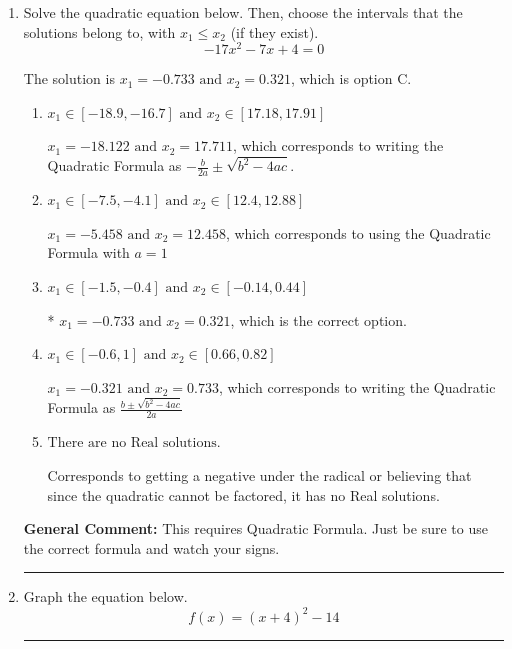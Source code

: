\documentclass{extbook}[14pt]
\newcommand{\litem}[1]{\item #1

\rule{\textwidth}{0.4pt}}
\begin{document}
\begin{enumerate}\litem{
Solve the quadratic equation below. Then, choose the intervals that the solutions belong to, with $x_1 \leq x_2$ (if they exist).
\[ -17x^{2} -7 x + 4 = 0 \]

The solution is \( x_1 = -0.733 \text{ and } x_2 = 0.321 \), which is option C.\begin{enumerate}[label=\Alph*.]
\item \( x_1 \in [-18.9, -16.7] \text{ and } x_2 \in [17.18, 17.91] \)

 $x_1 = -18.122 \text{ and } x_2 = 17.711$, which corresponds to writing the Quadratic Formula as $-\frac{b}{2a} \pm \sqrt{b^2 - 4ac}$.
\item \( x_1 \in [-7.5, -4.1] \text{ and } x_2 \in [12.4, 12.88] \)

 $x_1 = -5.458 \text{ and } x_2 = 12.458$, which corresponds to using the Quadratic Formula with $a=1$
\item \( x_1 \in [-1.5, -0.4] \text{ and } x_2 \in [-0.14, 0.44] \)

* $x_1 = -0.733 \text{ and } x_2 = 0.321$, which is the correct option.
\item \( x_1 \in [-0.6, 1] \text{ and } x_2 \in [0.66, 0.82] \)

 $x_1 = -0.321 \text{ and } x_2 = 0.733$, which corresponds to writing the Quadratic Formula as $\frac{b \pm \sqrt{b^2 - 4ac}}{2a}$
\item \( \text{There are no Real solutions.} \)

Corresponds to getting a negative under the radical or believing that since the quadratic cannot be factored, it has no Real solutions.
\end{enumerate}

\textbf{General Comment:} This requires Quadratic Formula. Just be sure to use the correct formula and watch your signs.
}
\litem{
Graph the equation below.
\[ f(x) = (x+4)^2 - 14 \]

}
\end{enumerate}
\end{document}
